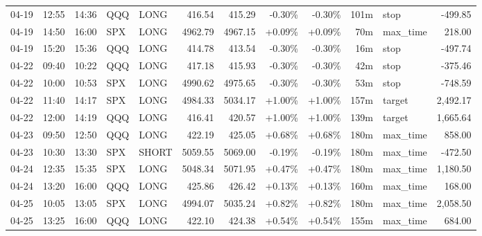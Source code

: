 \documentclass[11pt,a4paper,twoside]{article}
\begin{document}
\begin{center}
\begin{longtable}{>{\color{txtmain}}l l l l l r r r r r >{\color{txtmain}}l r}
04-19 & 12:55 & 14:36 & QQQ & LONG & 416.54 & 415.29 & \textcolor{lossred}{-0.30\%} & \textcolor{lossred}{-0.30\%} & 101m & stop & \textcolor{lossred}{-499.85} \\
04-19 & 14:50 & 16:00 & SPX & LONG & 4962.79 & 4967.15 & \textcolor{wingreen}{+0.09\%} & \textcolor{wingreen}{+0.09\%} & 70m & max\_time & \textcolor{wingreen}{218.00} \\
04-19 & 15:20 & 15:36 & QQQ & LONG & 414.78 & 413.54 & \textcolor{lossred}{-0.30\%} & \textcolor{lossred}{-0.30\%} & 16m & stop & \textcolor{lossred}{-497.74} \\
04-22 & 09:40 & 10:22 & QQQ & LONG & 417.18 & 415.93 & \textcolor{lossred}{-0.30\%} & \textcolor{lossred}{-0.30\%} & 42m & stop & \textcolor{lossred}{-375.46} \\
04-22 & 10:00 & 10:53 & SPX & LONG & 4990.62 & 4975.65 & \textcolor{lossred}{-0.30\%} & \textcolor{lossred}{-0.30\%} & 53m & stop & \textcolor{lossred}{-748.59} \\
04-22 & 11:40 & 14:17 & SPX & LONG & 4984.33 & 5034.17 & \textcolor{wingreen}{+1.00\%} & \textcolor{wingreen}{+1.00\%} & 157m & target & \textcolor{wingreen}{2,492.17} \\
04-22 & 12:00 & 14:19 & QQQ & LONG & 416.41 & 420.57 & \textcolor{wingreen}{+1.00\%} & \textcolor{wingreen}{+1.00\%} & 139m & target & \textcolor{wingreen}{1,665.64} \\
04-23 & 09:50 & 12:50 & QQQ & LONG & 422.19 & 425.05 & \textcolor{wingreen}{+0.68\%} & \textcolor{wingreen}{+0.68\%} & 180m & max\_time & \textcolor{wingreen}{858.00} \\
04-23 & 10:30 & 13:30 & SPX & SHORT & 5059.55 & 5069.00 & \textcolor{lossred}{-0.19\%} & \textcolor{lossred}{-0.19\%} & 180m & max\_time & \textcolor{lossred}{-472.50} \\
04-24 & 12:35 & 15:35 & SPX & LONG & 5048.34 & 5071.95 & \textcolor{wingreen}{+0.47\%} & \textcolor{wingreen}{+0.47\%} & 180m & max\_time & \textcolor{wingreen}{1,180.50} \\
04-24 & 13:20 & 16:00 & QQQ & LONG & 425.86 & 426.42 & \textcolor{wingreen}{+0.13\%} & \textcolor{wingreen}{+0.13\%} & 160m & max\_time & \textcolor{wingreen}{168.00} \\
04-25 & 10:05 & 13:05 & SPX & LONG & 4994.07 & 5035.24 & \textcolor{wingreen}{+0.82\%} & \textcolor{wingreen}{+0.82\%} & 180m & max\_time & \textcolor{wingreen}{2,058.50} \\
04-25 & 13:25 & 16:00 & QQQ & LONG & 422.10 & 424.38 & \textcolor{wingreen}{+0.54\%} & \textcolor{wingreen}{+0.54\%} & 155m & max\_time & \textcolor{wingreen}{684.00} \\

\end{longtable}
\end{center}
\end{document}
